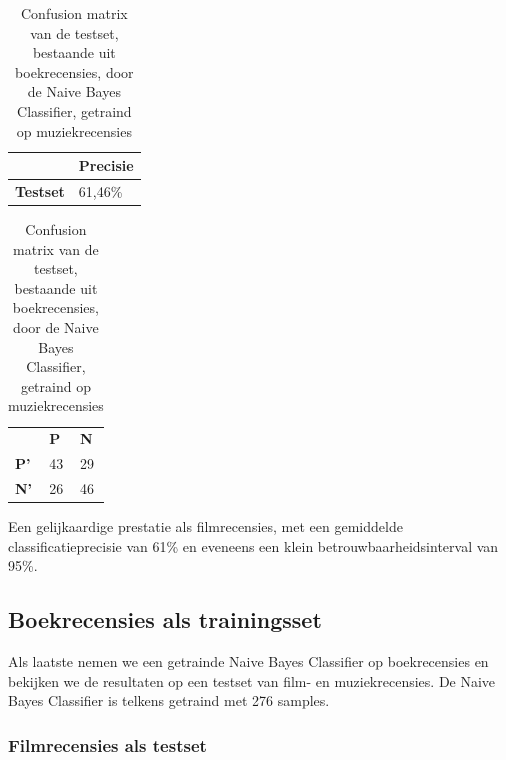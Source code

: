 \begin{table}[h]
\centering
\setlength\tabcolsep{4pt}
\begin{minipage}[t]{0.48\textwidth}
\centering
\begin{tabular}{l|l|}
\cline{2-2}
                                            & \textbf{Precisie} \\ \hline
\multicolumn{1}{|l|}{\textbf{Testset}}      & 61,46\%           \\ \hline
\end{tabular}
\caption{Classificatieprecisie Naive Bayes Classifier, getraind op muziekrecensies, getest op boekrecensies}
\end{minipage}%
\hfill
\begin{minipage}[t]{0.48\textwidth}
\centering
\begin{tabular}{lll}
                                 & \textbf{P}               & \textbf{N}               \\ \cline{2-3} 
\multicolumn{1}{l|}{\textbf{P'}} & \multicolumn{1}{l|}{43} & \multicolumn{1}{l|}{29} \\ \cline{2-3} 
\multicolumn{1}{l|}{\textbf{N'}} & \multicolumn{1}{l|}{26} & \multicolumn{1}{l|}{46} \\ \cline{2-3} 
\end{tabular}
\caption{Confusion matrix van de testset, bestaande uit boekrecensies, door de  Naive Bayes Classifier, getraind op muziekrecensies} 
\end{minipage}
\end{table}


Een gelijkaardige prestatie als filmrecensies, met een gemiddelde classificatieprecisie van 61\% en eveneens een klein betrouwbaarheidsinterval van 95\%.

\subsection{Boekrecensies als trainingsset}\label{Boekrecensies als trainingsset}

Als laatste nemen we een getrainde Naive Bayes Classifier op boekrecensies en bekijken we de resultaten op een testset van film- en muziekrecensies. De Naive Bayes Classifier is telkens getraind met 276 samples.


\subsubsection{Filmrecensies als testset}\label{Filmrecensies als testset}

